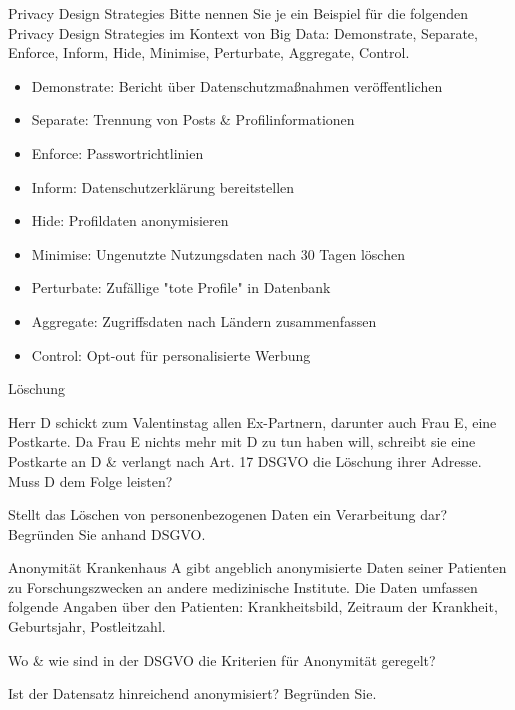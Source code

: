 \documentclass{exercisesheet}
\begin{document}
\begin{exercise}{Privacy Design Strategies}
  Bitte nennen Sie je ein Beispiel für die folgenden Privacy Design Strategies im Kontext von Big Data: Demonstrate, Separate, Enforce, Inform, Hide, Minimise, Perturbate, Aggregate, Control.

  \begin{solution}
    \begin{itemize}
      \item Demonstrate: Bericht über Datenschutzmaßnahmen veröffentlichen
      \item Separate: Trennung von Posts \& Profilinformationen
      \item Enforce: Passwortrichtlinien
      \item Inform: Datenschutzerklärung bereitstellen
      \item Hide: Profildaten anonymisieren
      \item Minimise: Ungenutzte Nutzungsdaten nach 30 Tagen löschen
      \item Perturbate: Zufällige "tote Profile" in Datenbank
      \item Aggregate: Zugriffsdaten nach Ländern zusammenfassen
      \item Control: Opt-out für personalisierte Werbung
    \end{itemize}
  \end{solution}
\end{exercise}

\begin{exercises}{Löschung}
\item Herr D schickt zum Valentinstag allen Ex-Partnern, darunter auch Frau E, eine Postkarte. Da Frau E nichts mehr mit D zu tun haben will, schreibt sie eine Postkarte an D \& verlangt nach Art. 17 DSGVO die Löschung ihrer Adresse. Muss D dem Folge leisten?
\item Stellt das Löschen von personenbezogenen Daten ein Verarbeitung dar? Begründen Sie anhand DSGVO.
\end{exercises}

\begin{eexercises}{Anonymität}{
    Krankenhaus A gibt angeblich anonymisierte Daten seiner Patienten zu Forschungszwecken an andere medizinische Institute. Die Daten umfassen folgende Angaben über den Patienten: Krankheitsbild, Zeitraum der Krankheit, Geburtsjahr, Postleitzahl.
  }
  \item Wo \& wie sind in der DSGVO die Kriterien für Anonymität geregelt?
  \item Ist der Datensatz hinreichend anonymisiert? Begründen Sie.
\end{eexercises}
\end{document}
